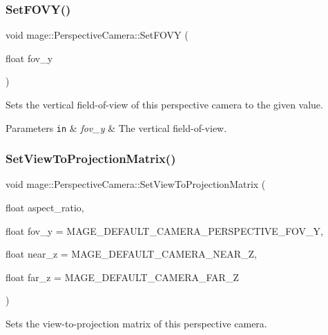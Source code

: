 \subsubsection{\texorpdfstring{Set\+F\+O\+V\+Y()}{SetFOVY()}}
{\footnotesize\ttfamily void mage\+::\+Perspective\+Camera\+::\+Set\+F\+O\+VY (\begin{DoxyParamCaption}\item[{float}]{fov\+\_\+y }\end{DoxyParamCaption})\hspace{0.3cm}{\ttfamily [noexcept]}}

Sets the vertical field-\/of-\/view of this perspective camera to the given value.


\begin{DoxyParams}[1]{Parameters}
\mbox{\tt in}  & {\em fov\+\_\+y} & The vertical field-\/of-\/view. \\
\hline
\end{DoxyParams}
\hypertarget{classmage_1_1_perspective_camera_af145d4d4defe4ca24c669a22fc02c2bc}{}\label{classmage_1_1_perspective_camera_af145d4d4defe4ca24c669a22fc02c2bc} 
\subsubsection{\texorpdfstring{Set\+View\+To\+Projection\+Matrix()}{SetViewToProjectionMatrix()}\hspace{0.1cm}{\footnotesize\ttfamily [1/2]}}
{\footnotesize\ttfamily void mage\+::\+Perspective\+Camera\+::\+Set\+View\+To\+Projection\+Matrix (\begin{DoxyParamCaption}\item[{float}]{aspect\+\_\+ratio,  }\item[{float}]{fov\+\_\+y = {\ttfamily MAGE\+\_\+DEFAULT\+\_\+CAMERA\+\_\+PERSPECTIVE\+\_\+FOV\+\_\+Y},  }\item[{float}]{near\+\_\+z = {\ttfamily MAGE\+\_\+DEFAULT\+\_\+CAMERA\+\_\+NEAR\+\_\+Z},  }\item[{float}]{far\+\_\+z = {\ttfamily MAGE\+\_\+DEFAULT\+\_\+CAMERA\+\_\+FAR\+\_\+Z} }\end{DoxyParamCaption})\hspace{0.3cm}{\ttfamily [noexcept]}}

Sets the view-\/to-\/projection matrix of this perspective camera.


